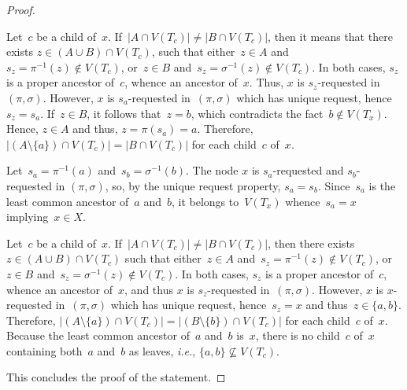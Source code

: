 \documentclass{lmcs} %
\newcommand{\card}[1]{\ensuremath{\left|#1\right|}}
\def\ie{{\em i.e.}}
\begin{document}
\begin{proof}
\begin{description}
            Let~$c$ be a child of~$x$.
            If~$\card{A\cap V(T_{c})}\neq\card{B\cap V(T_c)}$,
            then it means that there exists $z\in(A\cup B)\cap V(T_{c})$,
            such that
            either~$z\in A$ and $s_z=\pi^{-1}(z)\notin V(T_{c})$,
            or~$z\in B$ and~$s_z=\sigma^{-1}(z)\notin V(T_{c})$.
            In both cases, $s_z$ is a proper ancestor of~$c$,
            whence an ancestor of~$x$.
            Thus, $x$ is $s_z$-requested in~$(\pi,\sigma)$.
            However, $x$ is $s_a$-requested in~$(\pi,\sigma)$ which has unique request,
            hence~$s_z=s_a$.
            If~$z\in B$, it follows that~$z=b$, which contradicts the fact~$b\notin V(T_x)$.
            Hence, $z\in A$ and thus, $z=\pi(s_a)=a$.
            Therefore, $\card{(A\setminus\{a\})\cap V(T_{c})}=\card{B\cap V(T_c)}$
            for each child~$c$ of~$x$.
        \item[Case~$A'_x=\{a\}$ and~$B'_x=\{b\}$]
            Let~$s_a=\pi^{-1}(a)$ and~$s_b=\sigma^{-1}(b)$.
            The node $x$ is $s_a$-requested and $s_b$-requested in $(\pi,\sigma)$,
            so, by the unique request property, $s_a=s_b$.
            Since~$s_a$ is the least common ancestor of~$a$ and~$b$,
            it belongs to~$V(T_x)$
            whence~$s_a=x$ implying~$x\in X$.

            Let~$c$ be a child of~$x$.
            If~$\card{A\cap V(T_c)}\neq\card{B\cap V(T_c)}$,
            then there exists~$z\in (A\cup B)\cap V(T_{c})$
            such that either~$z\in A$ and~$s_z=\pi^{-1}(z)\notin V(T_{c})$,
            or~$z\in B$ and~$s_z=\sigma^{-1}(z)\notin V(T_{c})$.
            In both cases, $s_z$ is a proper ancestor of~$c$,
            whence an ancestor of~$x$,
            and thus $x$ is $s_z$-requested in~$(\pi,\sigma)$.
            However, $x$ is $x$-requested in~$(\pi,\sigma)$ which has unique request,
            hence~$s_z=x$ and thus~$z\in\{a,b\}$.
            Therefore, $\card{(A\setminus\{a\})\cap V(T_{c})}=\card{(B\setminus\{b\})\cap V(T_c)}$
            for each child~$c$ of~$x$.
            Because the least common ancestor of~$a$ and~$b$ is~$x$,
            there is no child~$c$ of~$x$ containing both~$a$ and~$b$ as leaves,
            \ie, $\{a,b\}\nsubseteq V(T_c)$.
    \end{description}
    This concludes the proof of the statement.
\end{proof}
\end{document}
